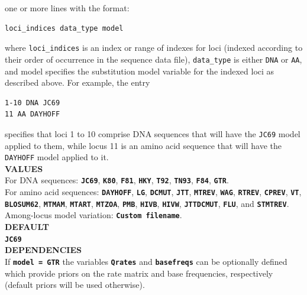 \documentclass[a4paper]{book}
\numberwithin{equation}{section} \renewcommand{\baselinestretch}{0.55}
\begin{document}
one or more lines with the format:
\begin{verbatim}
loci_indices data_type model
\end{verbatim}
where \texttt{loci\_indices} is an index or range of indexes for loci (indexed according to their order of occurrence in the sequence data file),
\texttt{data\_type} is either \texttt{DNA} or \texttt{AA}, and model specifies the substitution model variable for the indexed loci as described above.
For example, the entry
\begin{verbatim}
1-10 DNA JC69
11 AA DAYHOFF
\end{verbatim}
specifies that loci 1 to 10 comprise DNA sequences that will have the \texttt{JC69} model applied to them, while locus 11 is an amino acid sequence
that will have the \texttt{DAYHOFF} model applied to it.
\vspace{5pt}\\
\textbf{VALUES} \vspace{5pt}\\
For DNA sequences: \textbf{\texttt{JC69}}, \textbf{\texttt{K80}}, \textbf{\texttt{F81}}, \textbf{\texttt{HKY}}, \textbf{\texttt{T92}},
\textbf{\texttt{TN93}}, \textbf{\texttt{F84}}, \textbf{\texttt{GTR}}. \vspace{5pt}\\
For amino acid sequences: \textbf{\texttt{DAYHOFF}}, \textbf{\texttt{LG}}, \textbf{\texttt{DCMUT}}, \textbf{\texttt{JTT}}, \textbf{\texttt{MTREV}},
\textbf{\texttt{WAG}}, \textbf{\texttt{RTREV}}, \textbf{\texttt{CPREV}}, \textbf{\texttt{VT}}, \textbf{\texttt{BLOSUM62}}, \textbf{\texttt{MTMAM}},
\textbf{\texttt{MTART}}, \textbf{\texttt{MTZOA}}, \textbf{\texttt{PMB}}, \textbf{\texttt{HIVB}}, \textbf{\texttt{HIVW}}, \textbf{\texttt{JTTDCMUT}},
\textbf{\texttt{FLU}}, and \textbf{\texttt{STMTREV}}. \vspace{5pt}\\
Among-locus model variation: \textbf{\texttt{Custom filename}}. \vspace{5pt}\\
\textbf{DEFAULT} \vspace{5pt}\\
\textbf{\texttt{JC69}} \vspace{5pt}\\
\textbf{DEPENDENCIES} \vspace{5pt}\\
If \textbf{\texttt{model = GTR}} the variables \textbf{\texttt{Qrates}}
and \textbf{\texttt{basefreqs}} can be optionally defined which provide priors on the rate matrix and base frequencies, respectively (default priors will be used otherwise).
\end{document}
